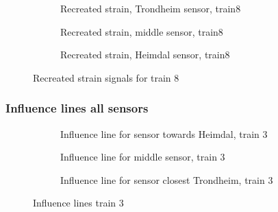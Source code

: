 \begin{figure}[htpb]
  \begin{subfigure}[t]{0.9\textwidth}
    \centering
    
    \caption{Recreated strain, Trondheim sensor, train8} %
    \label{recreated_sensor_trond_train8}
  \end{subfigure}
%
  \begin{subfigure}[t]{0.9\textwidth}
    \centering
    
    \caption{Recreated strain, middle sensor, train8} %
    \label{recreated_sensor_middle_train8}
  \end{subfigure}
%
  \begin{subfigure}[t]{0.9\textwidth}
    \centering
    
    \caption{Recreated strain, Heimdal sensor, train8} %
    \label{recreated_sensor_heimdal_train8}
  \end{subfigure}
%
  \caption{Recreated strain signals for train 8}
  \label{fig:recreated_strains_train8}
\end{figure}%

\subsubsection{Influence lines all sensors}%

\begin{figure}[htpb]
  \centering
  \begin{subfigure}[t]{0.9\textwidth}
    
    \caption{Influence line for sensor towards Heimdal, train 3}
    \label{infl_Heimdal_train3}
  \end{subfigure}
  \centering
  \begin{subfigure}[t]{0.9\textwidth}
    
    \caption{Influence line for middle sensor, train 3}
    \label{infl_middle_train3}
  \end{subfigure}
  \begin{subfigure}[t]{0.9\textwidth}
    
    \caption{Influence line for sensor closest Trondheim, train 3}
    \label{infl_Trondheim_train3}
  \end{subfigure}
  \caption{Influence lines train 3}
  \label{influence_lines_train3}
\end{figure}


